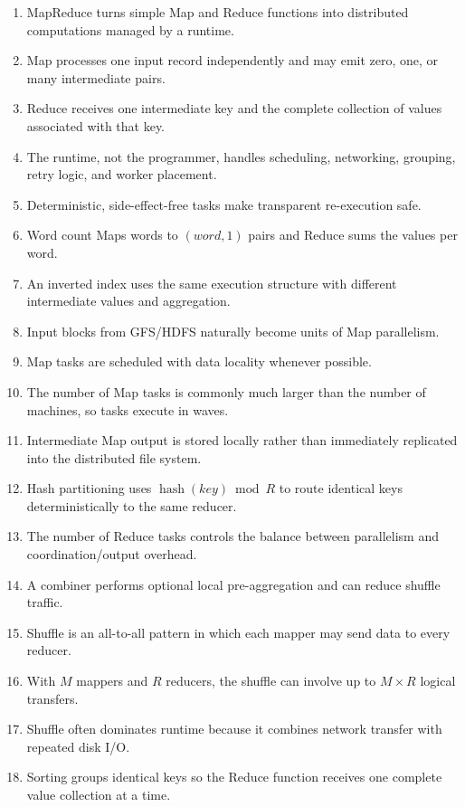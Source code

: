 \documentclass[11pt,a4paper,oneside]{book}
\begin{document}
\begin{enumerate}
    \item MapReduce turns simple Map and Reduce functions into distributed computations managed by a runtime.
    \item Map processes one input record independently and may emit zero, one, or many intermediate pairs.
    \item Reduce receives one intermediate key and the complete collection of values associated with that key.
    \item The runtime, not the programmer, handles scheduling, networking, grouping, retry logic, and worker placement.
    \item Deterministic, side-effect-free tasks make transparent re-execution safe.
    \item Word count Maps words to \((word,1)\) pairs and Reduce sums the values per word.
    \item An inverted index uses the same execution structure with different intermediate values and aggregation.
    \item Input blocks from GFS/HDFS naturally become units of Map parallelism.
    \item Map tasks are scheduled with data locality whenever possible.
    \item The number of Map tasks is commonly much larger than the number of machines, so tasks execute in waves.
    \item Intermediate Map output is stored locally rather than immediately replicated into the distributed file system.
    \item Hash partitioning uses \(\operatorname{hash}(key)\bmod R\) to route identical keys deterministically to the same reducer.
    \item The number of Reduce tasks controls the balance between parallelism and coordination/output overhead.
    \item A combiner performs optional local pre-aggregation and can reduce shuffle traffic.
    \item Shuffle is an all-to-all pattern in which each mapper may send data to every reducer.
    \item With \(M\) mappers and \(R\) reducers, the shuffle can involve up to \(M\times R\) logical transfers.
    \item Shuffle often dominates runtime because it combines network transfer with repeated disk I/O.
    \item Sorting groups identical keys so the Reduce function receives one complete value collection at a time.

\end{enumerate}
\end{document}
